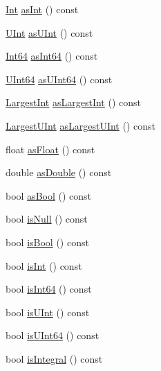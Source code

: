 \begin{DoxyCompactItemize}
\item 
\hyperlink{class_json_1_1_value_abdf7a7ff73eb130ffcab28504ffdb405}{Int} \hyperlink{class_json_1_1_value_a614d635bc248a592593feb322cd15ab8}{as\+Int} () const
\item 
\hyperlink{class_json_1_1_value_a0933d59b45793ae4aade1757c322a98d}{U\+Int} \hyperlink{class_json_1_1_value_a74b305583ec3aacf4f9dd06e799dc265}{as\+U\+Int} () const
\item 
\hyperlink{class_json_1_1_value_a1b86af9f85f0f1baa972c3319fa22695}{Int64} \hyperlink{class_json_1_1_value_aa647ac4fe51a2e325c063ebe32262b44}{as\+Int64} () const
\item 
\hyperlink{class_json_1_1_value_a8b62564be8c087c6d18de180ff4e13e3}{U\+Int64} \hyperlink{class_json_1_1_value_a0e44a5a4cd0c099f9570dfa25813eb60}{as\+U\+Int64} () const
\item 
\hyperlink{class_json_1_1_value_a1cbb82642ed05109b9833e49f042ece7}{Largest\+Int} \hyperlink{class_json_1_1_value_ab16f2ea2a117a1b3b576acab8b6a700d}{as\+Largest\+Int} () const
\item 
\hyperlink{class_json_1_1_value_a6682a3684d635e03fc06ba229fa24eec}{Largest\+U\+Int} \hyperlink{class_json_1_1_value_ad03548101e0bf3d2d9eac75c64a0b8d7}{as\+Largest\+U\+Int} () const
\item 
float \hyperlink{class_json_1_1_value_af3a4d10bf575fabdc5440a7135c9649c}{as\+Float} () const
\item 
double \hyperlink{class_json_1_1_value_afd24002a18aef907ad746b1cb9eda0a2}{as\+Double} () const
\item 
bool \hyperlink{class_json_1_1_value_ab693fb7b9b1595bb0adc49658bbf780d}{as\+Bool} () const
\item 
bool \hyperlink{class_json_1_1_value_abde4070e21e46dc4f8203f66582cb19f}{is\+Null} () const
\item 
bool \hyperlink{class_json_1_1_value_ab1f02651cb89d0f18b63a036959391ba}{is\+Bool} () const
\item 
bool \hyperlink{class_json_1_1_value_aff51d8b52979ca06cf9d909accd5f695}{is\+Int} () const
\item 
bool \hyperlink{class_json_1_1_value_a4a81fb3c3acdbb68b2e2f30836a4f53e}{is\+Int64} () const
\item 
bool \hyperlink{class_json_1_1_value_abdda463d3269015f883587349726cfbc}{is\+U\+Int} () const
\item 
bool \hyperlink{class_json_1_1_value_a883576e35cb03a785258edb56777a2de}{is\+U\+Int64} () const
\item 
bool \hyperlink{class_json_1_1_value_ab6798954f6e80281cf22708ef45198a7}{is\+Integral} () const

\end{DoxyCompactItemize}
